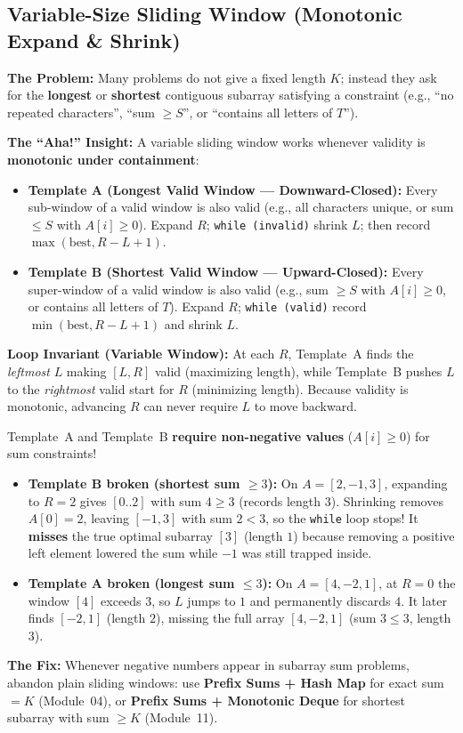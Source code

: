 \documentclass[11pt,a4paper]{article}
\theoremstyle{definition}
\newcommand{\painbeat}{\textbf{\color{accentamber}The Problem:} }
\newcommand{\ahabeat}{\textbf{\color{accentteal}The ``Aha!'' Insight:} }
\newcommand{\invariantbeat}[1]{\par\noindent\textbf{\color{accentteal}Loop Invariant (#1):} }
\begin{document}
\subsection{Variable-Size Sliding Window (Monotonic Expand \& Shrink)}

\painbeat Many problems do not give a fixed length $K$; instead they ask for the \textbf{longest} or \textbf{shortest} contiguous subarray satisfying a constraint (e.g., ``no repeated characters'', ``sum $\ge S$'', or ``contains all letters of $T$'').

\ahabeat A variable sliding window works whenever validity is \textbf{monotonic under containment}:
\begin{itemize}[itemsep=2pt, topsep=2pt]
    \item \textbf{Template A (Longest Valid Window --- Downward-Closed):} Every sub-window of a valid window is also valid (e.g., all characters unique, or sum $\le S$ with $A[i] \ge 0$). Expand $R$; \texttt{while (invalid)} shrink $L$; then record $\max(\text{best}, R - L + 1)$.
    \item \textbf{Template B (Shortest Valid Window --- Upward-Closed):} Every super-window of a valid window is also valid (e.g., sum $\ge S$ with $A[i] \ge 0$, or contains all letters of $T$). Expand $R$; \texttt{while (valid)} record $\min(\text{best}, R - L + 1)$ and shrink $L$.
\end{itemize}

\invariantbeat{Variable Window} At each $R$, Template~A finds the \emph{leftmost} $L$ making $[L, R]$ valid (maximizing length), while Template~B pushes $L$ to the \emph{rightmost} valid start for $R$ (minimizing length). Because validity is monotonic, advancing $R$ can never require $L$ to move backward.

\begin{watchoutbox}
Template~A and Template~B \textbf{require non-negative values} ($A[i] \ge 0$) for sum constraints!
\begin{itemize}[itemsep=2pt, topsep=2pt]
    \item \textbf{Template B broken (shortest sum $\ge 3$):} On $A = [2, -1, 3]$, expanding to $R = 2$ gives $[0..2]$ with sum $4 \ge 3$ (records length $3$). Shrinking removes $A[0] = 2$, leaving $[-1, 3]$ with sum $2 < 3$, so the \texttt{while} loop stops! It \textbf{misses} the true optimal subarray $[3]$ (length $1$) because removing a positive left element lowered the sum while $-1$ was still trapped inside.
    \item \textbf{Template A broken (longest sum $\le 3$):} On $A = [4, -2, 1]$, at $R = 0$ the window $[4]$ exceeds $3$, so $L$ jumps to $1$ and permanently discards $4$. It later finds $[-2, 1]$ (length $2$), missing the full array $[4, -2, 1]$ (sum $3 \le 3$, length $3$).
\end{itemize}
\textbf{The Fix:} Whenever negative numbers appear in subarray sum problems, abandon plain sliding windows: use \textbf{Prefix Sums + Hash Map} for exact sum $= K$ (Module~04), or \textbf{Prefix Sums + Monotonic Deque} for shortest subarray with sum $\ge K$ (Module~11).
\end{watchoutbox}
\end{document}
